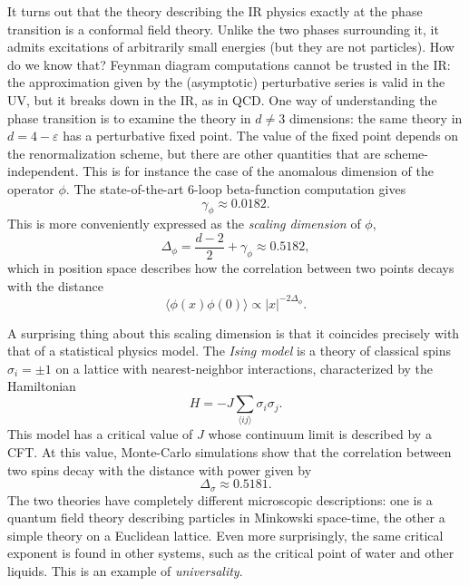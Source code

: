 \documentclass[a4paper,12pt]{article}
\numberwithin{equation}{section}
\begin{document}
\begin{itemize}
It turns out that the theory describing the IR physics exactly at the phase transition is a conformal field theory. Unlike the two phases surrounding it, it admits excitations of arbitrarily small energies (but they are not particles). How do we know that? Feynman diagram computations cannot be trusted in the IR: the approximation given by the (asymptotic) perturbative series is valid in the UV, but it breaks down in the IR, as in QCD. One way of understanding the phase transition is to examine the theory in $d \neq 3$ dimensions: the same theory in $d = 4 - \varepsilon$ has a perturbative fixed point. The value of the fixed point depends on the renormalization scheme, but there are other quantities that are scheme-independent. This is for instance the case of the anomalous dimension of the operator $\phi$.
The state-of-the-art 6-loop beta-function computation gives
\begin{equation}
	\gamma_\phi \approx 0.0182.
\end{equation}
This is more conveniently expressed as the \emph{scaling dimension} of $\phi$,
\begin{equation}
	\Delta_\phi = \frac{d-2}{2} + \gamma_\phi \approx 0.5182,
\end{equation}
which in position space describes how the correlation between two points decays with the distance
\begin{equation}
	\langle \phi(x) \phi(0) \rangle \propto |x|^{-2\Delta_\phi}.
\end{equation}

A surprising thing about this scaling dimension is that it coincides precisely with that of a statistical physics model. The \emph{Ising model} is a theory of classical spins $\sigma_i = \pm 1$ on a lattice with nearest-neighbor interactions, characterized by the Hamiltonian
\begin{equation}
	H = - J \sum_{\langle ij \rangle} \sigma_i \sigma_j.
\end{equation}
This model has a critical value of $J$ whose continuum limit is described by a CFT. At this value, Monte-Carlo simulations show that the correlation between two spins decay with the distance with power given by
\begin{equation}
	\Delta_\sigma \approx 0.5181.
\end{equation}
The two theories have completely different microscopic descriptions: one is a quantum field theory describing particles in Minkowski space-time, the other a simple theory on a Euclidean lattice. 
Even more surprisingly, the same critical exponent is found in other systems, such as the critical point of water and other liquids. This is an example of \emph{universality}.


\end{itemize}
\end{document}
